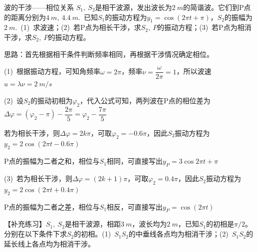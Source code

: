 \begin{example}{波的干涉——相位关系}
    $S_1,~S_2$是相干波源，发出波长为$\SI{2}{m}$的简谐波。它们到P点的距离分别为$\SI{4}{m},~\SI{4.4}{m}$.~已知$S_1$的振动方程为$y_1=\cos{(2\pi t+\pi)}$，$S_2$的振幅为$\SI{2}{m}$.~(1)~求波速；(2)~若P点为相长干涉，求$S_2,~P$的振动方程；(3)~若P点为相消干涉，求$S_2,~P$的振动方程。

    \tcblower

    {\fangsong 思路：首先根据相干条件判断频率相同，再根据干涉情况确定相位。}

    \tcbline
    (1)~根据振动方程，可知角频率$\omega=2\pi$，频率$\nu=\dfrac{\omega}{2\pi}=1$，所以波速$u=\lambda\nu=\SI{2}{m/s}$

    \vspace{0.3em}

    (2)~设$S_2$的振动初相为$\varphi_2$，代入公式可知，两列波在P点的相位差为$\Delta \varphi=(\varphi_2-\pi)-\dfrac{2\pi}{5}=\varphi_2-\dfrac{7\pi}{5}$

    若为相长干涉，则$\Delta \varphi=2k\pi$，可取$\varphi_2=-0.6\pi$，因此$S_2$振动方程为$y_2=2\cos{(2\pi t-0.6\pi)}$

    P点的振幅为二者之和，相位与$S_1$相同，可直接写出$y_P=3\cos{2\pi t+\pi}$

    (3)~若为相长干涉，则$\Delta \varphi=(2k+1)\pi$，可取$\varphi_2=0.4\pi$，因此$S_2$振动方程为$y_2=2\cos{(2\pi t+0.4\pi)}$

    P点的振幅为二者之差，相位与$S_1$相反，可直接写出$y_P=\cos{(2\pi t)}$

    \tcbline

    【补充练习】$S_1,~S_2$是相干波源，相距$\SI{3}{m}$，波长均为$\SI{2}{m}$，已知$S_1$的初相是$\pi/2$。分别在以下条件下求$S_2$的初相。(1)~$S_1S_2$的中垂线各点均为相消干涉；(2)~$S_1S_2$的延长线上各点均为相消干涉。
\end{example}

